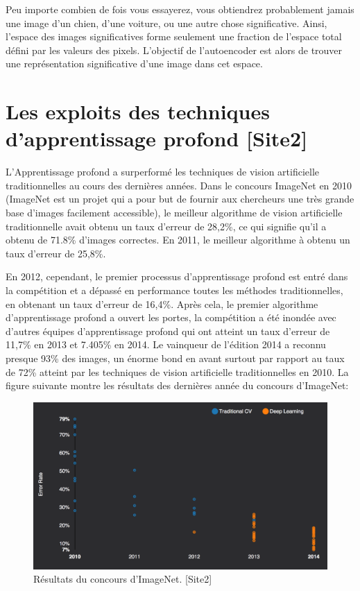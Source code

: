 	Peu importe combien de fois vous essayerez, vous obtiendrez probablement jamais une image d'un chien, d'une voiture, ou une autre chose significative.
Ainsi, l'espace des images significatives forme seulement une fraction de l'espace total défini par les valeurs des pixels. L'objectif de l'autoencoder est alors de trouver une représentation significative d'une image dans cet espace.

\section{Les exploits des techniques d'apprentissage profond [Site2]}

	L'Apprentissage profond a surperformé les techniques de vision artificielle traditionnelles au cours des dernières années. Dans le concours ImageNet en 2010 (ImageNet est un projet qui a pour but de fournir aux chercheurs une très grande base d'images facilement accessible), le meilleur algorithme de vision artificielle traditionnelle avait obtenu un taux d'erreur de 28,2\%, ce qui signifie qu'il a obtenu de 71.8\% d'images correctes. En 2011, le meilleur algorithme à obtenu un taux d'erreur de 25,8\%. 

	En 2012, cependant, le premier processus d'apprentissage profond est entré dans la compétition et a dépassé en performance toutes les méthodes traditionnelles, en obtenant un taux d'erreur de 16,4\%.
	Après cela, le premier algorithme d'apprentissage profond a ouvert les portes, la compétition a été inondée avec d'autres équipes d'apprentissage profond qui ont atteint un taux d'erreur de 11,7\% en 2013 et 7.405\% en 2014. Le vainqueur de l'édition 2014 a reconnu presque 93\% des images, un énorme bond en avant surtout par rapport au taux de 72\% atteint par les techniques de vision artificielle traditionnelles en 2010. La figure suivante montre les résultats des dernières année du concours d'ImageNet:

\begin{figure}[H]
	\centering
		\includegraphics[width=5in]{Figures/clairifaiIMAGENET.png}
	\caption[An Electron]{Résultats du concours d'ImageNet. [Site2]}
	\label{fig:Electron}
\end{figure}

